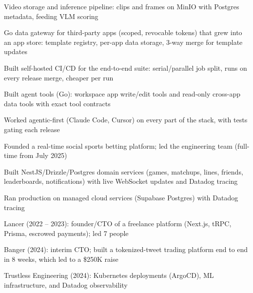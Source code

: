 \documentclass[print]{jack-resume}
\begin{document}
\begin{tightemize}
    \item Video storage and inference pipeline: clips and frames on MinIO with Postgres metadata, feeding VLM scoring
    \item Go data gateway for third-party apps (scoped, revocable tokens) that grew into an app store: template registry, per-app data storage, 3-way merge for template updates
    \item Built self-hosted CI/CD for the end-to-end suite: serial/parallel job split, runs on every release merge, cheaper per run
    \item Built agent tools (Go): workspace app write/edit tools and read-only cross-app data tools with exact tool contracts
    \item Worked agentic-first (Claude Code, Cursor) on every part of the stack, with tests gating each release
\end{tightemize}
\sectionsep

\begin{tightemize}
    \item Founded a real-time social sports betting platform; led the engineering team (full-time from July 2025)
    \item Built NestJS/Drizzle/Postgres domain services (games, matchups, lines, friends, leaderboards, notifications) with live WebSocket updates and Datadog tracing
    \item Ran production on managed cloud services (Supabase Postgres) with Datadog tracing
\end{tightemize}
\sectionsep

\begin{tightemize}
    \item Lancer (2022 -- 2023): founder/CTO of a freelance platform (Next.js, tRPC, Prisma, escrowed payments); led 7 people
    \item Banger (2024): interim CTO; built a tokenized-tweet trading platform end to end in 8 weeks, which led to a \$250K raise
    \item Trustless Engineering (2024): Kubernetes deployments (ArgoCD), ML infrastructure, and Datadog observability
\end{tightemize}
\sectionsep
\end{document}
